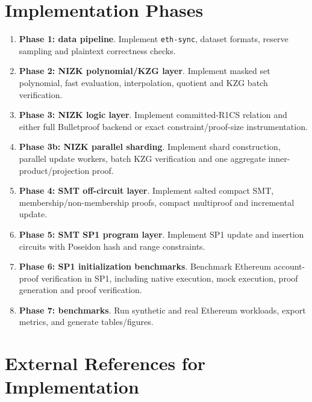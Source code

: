 \documentclass[UTF8,a4paper,11pt]{ctexart}
\begin{document}
\section{Implementation Phases}

\begin{enumerate}[leftmargin=2em]
  \item \textbf{Phase 1: data pipeline}. Implement \texttt{eth-sync}, dataset formats, reserve sampling and plaintext correctness checks.
  \item \textbf{Phase 2: NIZK polynomial/KZG layer}. Implement masked set polynomial, fast evaluation, interpolation, quotient and KZG batch verification.
  \item \textbf{Phase 3: NIZK logic layer}. Implement committed-R1CS relation and either full Bulletproof backend or exact constraint/proof-size instrumentation.
  \item \textbf{Phase 3b: NIZK parallel sharding}. Implement shard construction, parallel update workers, batch KZG verification and one aggregate inner-product/projection proof.
  \item \textbf{Phase 4: SMT off-circuit layer}. Implement salted compact SMT, membership/non-membership proofs, compact multiproof and incremental update.
  \item \textbf{Phase 5: SMT SP1 program layer}. Implement SP1 update and insertion circuits with Poseidon hash and range constraints.
  \item \textbf{Phase 6: SP1 initialization benchmarks}. Benchmark Ethereum account-proof verification in SP1, including native execution, mock execution, proof generation and proof verification.
  \item \textbf{Phase 7: benchmarks}. Run synthetic and real Ethereum workloads, export metrics, and generate tables/figures.
\end{enumerate}

\section{External References for Implementation}
\end{document}

